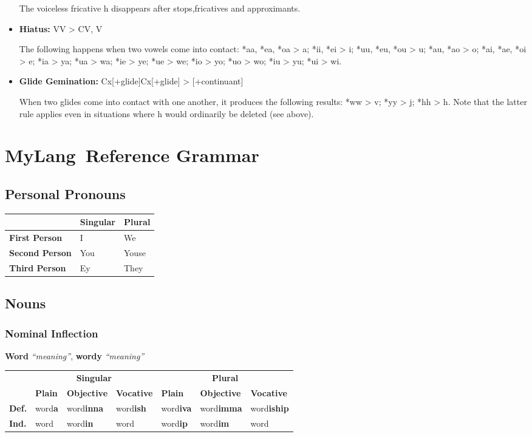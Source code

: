 \documentclass[oneside]{book}
\newcommand{\LanguageName}{MyLang}
\begin{document}
\begin{itemize}
The voiceless fricative h disappears after stops,fricatives and approximants.
\item
\textbf{Hiatus:}
VV > CV, V

The following happens when two vowels come into contact:
*aa, *ea, *oa > a; *ii, *ei > i; *uu, *eu, *ou > u; *au, *ao > o; *ai, *ae, *oi > e; *ia > ya; *ua > wa; *ie > ye; *ue > we; *io > yo; *uo > wo; *iu > yu; *ui > wi.
\item
\textbf{Glide Gemination:}
Cx[+glide]Cx[+glide] > [+continuant]

When two glides come into contact with one another, it produces the following results:
*ww > v; *yy > j; *hh > h.
Note that the latter rule applies even in situations where h would ordinarily be deleted (see above).
\end{itemize}

\chapter{\LanguageName\ Reference Grammar}

\section{Personal Pronouns}

\begin{center}
\begin{tabular}{|l|l|l|}\hline
&\textbf{Singular}&\textbf{Plural}\\\hline
\textbf{First Person}&I&We\\\hline
\textbf{Second Person}&You&Youse\\\hline
\textbf{Third Person}&Ey&They\\\hline
\end{tabular}
\end{center}

\section{Nouns}

\subsection{Nominal Inflection}

\textbf{Word} \textit{``meaning''}, \textbf{wordy} \textit{``meaning''}

\begin{center}
\begin{tabular}{|l|l|l|l|l|l|l|}\hline
&\multicolumn{3}{|c|}{\textbf{Singular}}&\multicolumn{3}{|c|}{\textbf{Plural}}\\\cline{2-7}
&\textbf{Plain}&\textbf{Objective}&\textbf{Vocative}&\textbf{Plain}&\textbf{Objective}&\textbf{Vocative}\\\hline
\textbf{Def.}&word\textbf{a}&word\textbf{inna}&word\textbf{ish}&word\textbf{iva}&word\textbf{imma}&word\textbf{iship}\\\hline
\textbf{Ind.}&word&word\textbf{in}&word&word\textbf{ip}&word\textbf{im}&word\\\hline
\end{tabular}
\end{center}
\end{document}
